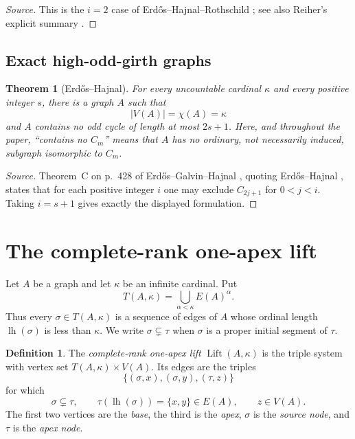 \documentclass[11pt]{amsart}
\newtheorem{theorem}{Theorem}[section]
\theoremstyle{definition}
\newtheorem{definition}[definition]{Definition}
\theoremstyle{remark}
\numberwithin{equation}{section}
\newcommand{\Lift}{\operatorname{Lift}}
\newcommand{\lh}{\operatorname{lh}}
\begin{document}
\begin{proof}[Source]
This is the $i=2$ case of Erd\H{o}s--Hajnal--Rothschild
\cite[Theorem~2, p.~532]{EHR1973}; see also Reiher's explicit summary
\cite[p.~1]{ReiherObligatory}.
\end{proof}

\subsection{Exact high-odd-girth graphs}

\begin{theorem}[Erd\H{o}s--Hajnal]
\label{thm:EH-odd-girth}
For every uncountable cardinal $\kappa$ and every positive integer $s$,
there is a graph $A$ such that
\[
 |V(A)|=\chi(A)=\kappa
\]
and $A$ contains no odd cycle of length at most $2s+1$.  Here, and
throughout the paper, ``contains no $C_m$'' means that $A$ has no ordinary,
not necessarily induced, subgraph isomorphic to $C_m$.
\end{theorem}

\begin{proof}[Source]
Theorem~C on p.~428 of Erd\H{o}s--Galvin--Hajnal \cite{EGH},
quoting Erd\H{o}s--Hajnal \cite[Theorem~7.4, p.~76]{EH1966}, states that
for each positive integer $i$ one may exclude $C_{2j+1}$ for
$0<j<i$.  Taking $i=s+1$ gives exactly the displayed formulation.
\end{proof}


\section{The complete-rank one-apex lift}
\label{sec:lift}

Let $A$ be a graph and let $\kappa$ be an infinite cardinal.  Put
\[
 T(A,\kappa)=\bigcup_{\alpha<\kappa}E(A)^\alpha.
\]
Thus every $\sigma\in T(A,\kappa)$ is a sequence of edges of $A$ whose
ordinal length $\lh(\sigma)$ is less than $\kappa$.  We write
$\sigma\subsetneq\tau$ when $\sigma$ is a proper initial segment of
$\tau$.

\begin{definition}
The \emph{complete-rank one-apex lift} $\Lift(A,\kappa)$ is the triple
system with vertex set $T(A,\kappa)\times V(A)$.  Its edges are the
triples
\begin{equation}
 \{(\sigma,x),(\sigma,y),(\tau,z)\}\label{eq:lift-edge}
\end{equation}
for which
\[
 \sigma\subsetneq\tau,
 \qquad \tau(\lh(\sigma))=\{x,y\}\in E(A),
 \qquad z\in V(A).
\]
The first two vertices are the \emph{base}, the third is the
\emph{apex}, $\sigma$ is the \emph{source node}, and $\tau$ is the
\emph{apex node}.
\end{definition}
\end{document}
